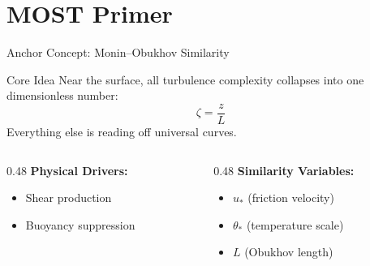 \documentclass[10pt,aspectratio=169]{beamer}
\begin{document}
\section{MOST Primer}

\begin{frame}{Anchor Concept: Monin--Obukhov Similarity}
  \begin{block}{Core Idea}
    Near the surface, all turbulence complexity collapses into \alert{one dimensionless number}:
    \[
    \zeta = \frac{z}{L}
    \]
    Everything else is reading off universal curves.
  \end{block}
  
  \pause
  \begin{columns}[T]
    \begin{column}{0.48\textwidth}
      \textbf{Physical Drivers:}
      \begin{itemize}
        \item Shear production
        \item Buoyancy suppression
      \end{itemize}
    \end{column}
    \begin{column}{0.48\textwidth}
      \textbf{Similarity Variables:}
      \begin{itemize}
        \item $u_*$ (friction velocity)
        \item $\theta_*$ (temperature scale)
        \item $L$ (Obukhov length)
      \end{itemize}
    \end{column}
  \end{columns}
\end{frame}
\end{document}
